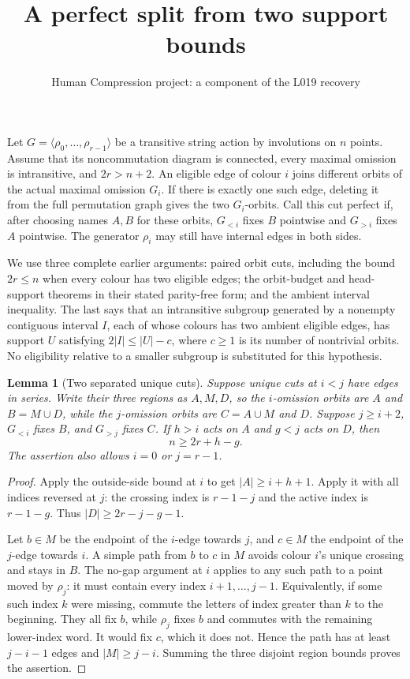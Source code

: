 \documentclass[11pt,a4paper]{article}
\title{A perfect split from two support bounds}
\author{Human Compression project: a component of the L019 recovery}
\date{}
\newtheorem{lemma}{Lemma}
\newcommand{\gen}[1]{\langle#1\rangle}
\begin{document}
\maketitle
Let $G=\gen{\rho_0,\ldots,\rho_{r-1}}$ be a transitive
string action by involutions on $n$ points. Assume that its
noncommutation diagram is connected, every maximal omission
is intransitive, and $2r>n+2$.
An eligible edge of colour $i$ joins different orbits of the
actual maximal omission $G_i$. If there is exactly one such
edge, deleting it from the full permutation graph gives the
two $G_i$-orbits. Call this cut perfect if, after choosing
names $A,B$ for these orbits, $G_{<i}$ fixes $B$ pointwise
and $G_{>i}$ fixes $A$ pointwise. The generator $\rho_i$
may still have internal edges in both sides.

We use three complete earlier arguments: paired orbit cuts,
including the bound $2r\le n$ when every colour has two
eligible edges; the orbit-budget and head-support theorems
in their stated parity-free form; and the ambient interval
inequality. The last says that an intransitive subgroup
generated by a nonempty contiguous interval $I$, each of
whose colours has two ambient eligible edges, has support
$U$ satisfying $2|I|\le |U|-c$, where $c\ge1$ is its
number of nontrivial orbits. No eligibility relative to a
smaller subgroup is substituted for this hypothesis.

\begin{lemma}[Two separated unique cuts]\label{three}
Suppose unique cuts at $i<j$ have edges in series. Write their
three regions as $A,M,D$, so the $i$-omission orbits are
$A$ and $B=M\cup D$, while the $j$-omission orbits are
$C=A\cup M$ and $D$. Suppose $j\ge i+2$, $G_{<i}$ fixes
$B$, and $G_{>j}$ fixes $C$. If $h>i$ acts on $A$ and
$g<j$ acts on $D$, then
\[
                         n\ge 2r+h-g.
\]
The assertion also allows $i=0$ or $j=r-1$.
\end{lemma}
\begin{proof}
Apply the outside-side bound at $i$ to get
$|A|\ge i+h+1$. Apply it with all indices reversed at $j$:
the crossing index is $r-1-j$ and the active index is
$r-1-g$. Thus $|D|\ge2r-j-g-1$.

Let $b\in M$ be the endpoint of the $i$-edge towards $j$,
and $c\in M$ the endpoint of the $j$-edge towards $i$.
A simple path from $b$ to $c$ in $M$ avoids colour $i$'s
unique crossing and stays in $B$. The no-gap argument at
$i$ applies to any such path to a point moved by $\rho_j$:
it must contain every index $i+1,\ldots,j-1$.
Equivalently, if some such index $k$ were missing, commute
the letters of index greater than $k$ to the beginning.
They all fix $b$, while $\rho_j$ fixes $b$ and commutes
with the remaining lower-index word. It would fix $c$,
which it does not. Hence the path has at least $j-i-1$
edges and $|M|\ge j-i$. Summing the three disjoint region
bounds proves the assertion.
\end{proof}
\end{document}
